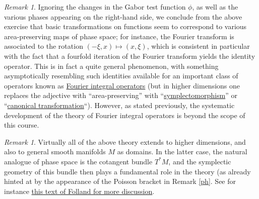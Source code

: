 \documentclass[11pt]{article}
\theoremstyle{definition}
\theoremstyle{remark}
\newtheorem{remark}[theorem]{Remark}
\begin{document}
\begin{remark}
  Ignoring the changes in the Gabor test function \({\phi}\), as well as the various phases appearing on the right-hand side, we conclude from the above exercise that basic transformations on functions seem to correspond to various area-preserving maps of phase space; for instance, the Fourier transform is associated to the rotation \({(-\xi,x) \mapsto (x,\xi)}\), which is consistent in particular with the fact that a fourfold iteration of the Fourier transform yields the identity operator. This is in fact a quite general phenomenon, with something asymptotically resembling such identities available for an important class of operators known as \href{https://en.wikipedia.org/wiki/Fourier_integral_operator}{Fourier integral operators} (but in higher dimensions one replaces the adjective with “area-preserving” with “\href{https://en.wikipedia.org/wiki/Symplectomorphism}{symplectomorphism}” or “\href{https://en.wikipedia.org/wiki/Canonical_transformation}{canonical transformation}“). However, as stated previously, the systematic development of the theory of Fourier integral operators is beyond the scope of this course. 
\end{remark}
\begin{remark}
  Virtually all of the above theory extends to higher dimensions, and also to general smooth manifolds \({M}\) as domains. In the latter case, the natural analogue of phase space is the cotangent bundle \({T^* M}\), and the symplectic geometry of this bundle then plays a fundamental role in the theory (as already hinted at by the appearance of the Poisson bracket in Remark \ref{ph}. See for instance \href{https://mathscinet.ams.org/mathscinet-getitem?mr=983366}{this text of Folland for more discussion}. 
\end{remark}
 
\end{document}
